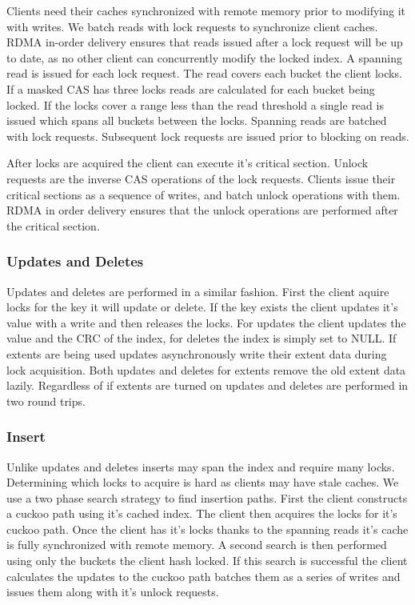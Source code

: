 Clients need their caches synchronized with remote memory
prior to modifying it with writes. We batch reads with lock
requests to synchronize client caches. RDMA in-order
delivery ensures that reads issued after a lock request will
be up to date, as no other client can concurrently modify
the locked index.  A spanning read is issued for each lock
request. The read covers each bucket the client locks. If a
masked CAS has three locks reads are calculated for each
bucket being locked. If the locks cover a range less than
the read threshold a single read is issued which spans all
buckets between the locks. Spanning reads are batched with
lock requests. Subsequent lock requests are issued prior to
blocking on reads.

After locks are acquired the client can execute it's
critical section. Unlock requests are the inverse CAS
operations of the lock requests. Clients issue their
critical sections as a sequence of writes, and batch unlock
operations with them. RDMA in order delivery ensures that
the unlock operations are performed after the critical
section.

\subsubsection{Updates and Deletes}

Updates and deletes are performed in a similar fashion.
First the client aquire locks for the key it will update or
delete. If the key exists the client updates it's value with
a write and then releases the locks. For updates the client
updates the value and the CRC of the index, for deletes the
index is simply set to NULL. If extents are being used
updates asynchronously write their extent data during lock
acquisition. Both updates and deletes for extents remove the
old extent data lazily. Regardless of if extents are turned
on updates and deletes are performed in two round trips.

\subsubsection{Insert}

Unlike updates and deletes inserts may span the index and
require many locks. Determining which locks to acquire is
hard as clients may have stale caches. We use a two phase
search strategy to find insertion paths. First the client
constructs a cuckoo path using it's cached index. The client
then acquires the locks for it's cuckoo path. Once the
client has it's locks thanks to the spanning reads it's
cache is fully synchronized with remote memory. A second
search is then performed using only the buckets the client
hash locked. If this search is successful the client
calculates the updates to the cuckoo path batches them as a
series of writes and issues them along with it's unlock
requests.

